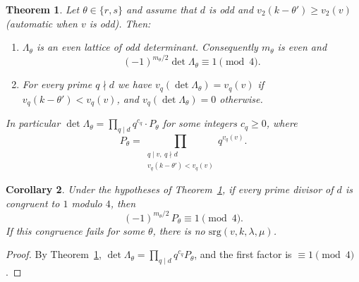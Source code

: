 \documentclass[11pt]{amsart}
\newtheorem{theorem}{Theorem}
\newtheorem{corollary}[theorem]{Corollary}
\theoremstyle{remark}
\begin{document}
\begin{theorem}\label{thm:main}
Let $\theta\in\{r,s\}$ and assume that $d$ is odd and $v_2(k-\theta')\ge v_2(v)$ (automatic when $v$ is odd). Then:
\begin{enumerate}
\item[(a)] $\Lambda_\theta$ is an even lattice of odd determinant. Consequently $m_\theta$ is even and
\[(-1)^{m_\theta/2}\det\Lambda_\theta\equiv 1\pmod 4 .\]
\item[(b)] For every prime $q\nmid d$ we have $v_q(\det\Lambda_\theta)=v_q(v)$ if $v_q(k-\theta')<v_q(v)$, and
$v_q(\det\Lambda_\theta)=0$ otherwise.
\end{enumerate}
In particular $\det\Lambda_\theta=\prod_{q\mid d}q^{c_q}\cdot P_\theta$ for some integers $c_q\ge0$, where
\[
P_\theta=\prod_{\substack{q\mid v,\ q\nmid d\\ v_q(k-\theta')<v_q(v)}}q^{v_q(v)} .
\]
\end{theorem}

\begin{corollary}\label{cor:mod4}
Under the hypotheses of Theorem~\ref{thm:main}, if every prime divisor of $d$ is congruent to $1$ modulo $4$, then
\[
(-1)^{m_\theta/2}\,P_\theta\equiv 1\pmod 4 .
\]
If this congruence fails for some $\theta$, there is no $\mathrm{srg}(v,k,\lambda,\mu)$.
\end{corollary}

\begin{proof}
By Theorem~\ref{thm:main}, $\det\Lambda_\theta=\prod_{q\mid d}q^{c_q}P_\theta$, and the first factor is $\equiv1\pmod 4$.
\end{proof}
\end{document}
